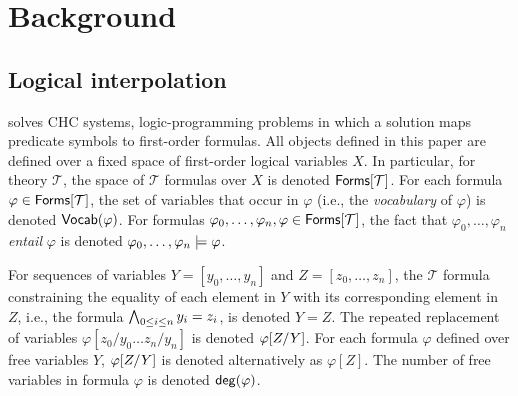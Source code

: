 \section{Background}
\label{sec:background}

\subsection{Logical interpolation}
\label{sec:itps}
%
\sys solves CHC systems, logic-programming problems in which a
solution maps predicate symbols to first-order formulas.
%
All objects defined in this paper are defined over a fixed space of
first-order logical variables $X$.
%
In particular, for theory $\mathcal{T}$, the space of $\mathcal{T}$
formulas over $X$ is denoted $\tformulas{\mathcal{T}}$.
%
For each formula $\varphi \in \tformulas{\mathcal{T}}$, the set of
variables that occur in $\varphi$ (i.e., the \emph{vocabulary} of
$\varphi$) is denoted $\vocab(\varphi)$.
For formulas $\varphi_0, \ldots, \varphi_n, \varphi \in
\tformulas{\mathcal{T}}$, the fact that $\varphi_0, \ldots, \varphi_n$
\emph{entail} $\varphi$ is denoted $\varphi_0, \ldots, \varphi_n
\entails \varphi$.

For sequences of variables $Y = [ y_0, \ldots, y_n ]$ and $Z = [ z_0,
\ldots, z_n ]$, the $\mathcal{T}$ formula constraining the equality of
each element in $Y$ with its corresponding element in $Z$, i.e., the
formula $\bigland_{0 \leq i \leq n} y_i = z_i$, is denoted $Y = Z$.
%
The repeated replacement of variables $\varphi[ z_0 / y_0 \ldots z_{n}
/ y_{n} ]$ is denoted $\replace{\varphi}{Y}{Z}$.
%
For each formula $\varphi$ defined over free variables $Y$,
$\replace{\varphi}{Y}{Z}$ is denoted alternatively as $\varphi[ Z ]$.
%
The number of free variables in formula $\varphi$ is denoted
$\degreeof{\varphi}$.

